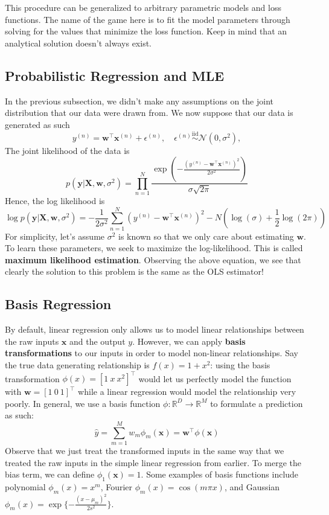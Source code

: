 \documentclass[11pt, letterpaper]{article}
\theoremstyle{definition}
\theoremstyle{plain}
\begin{document}
This procedure can be generalized to arbitrary parametric models and loss functions. The name of the game here is to fit the model parameters through solving for the values that minimize the loss function. Keep in mind that an analytical solution doesn't always exist.

\subsection{Probabilistic Regression and MLE}
In the previous subsection, we didn't make any assumptions on the joint distribution that our data were drawn from. We now suppose that our data is generated as such
\[y^{(n)} = \bm{w}^\top\bm{x}^{(n)} + \epsilon^{(n)}, \quad \epsilon^{(n)} \overset{\mathrm{iid}}{\sim} \mathcal{N}(0, \sigma^2),\]
The joint likelihood of the data is
\[p(\bm y | \bm X, \bm w, \sigma^2) = \prod_{n=1}^{N}\frac{\exp\left(-\frac{(y^{(n)} - \bm{w}^\top\bm{x}^{(n)})^2}{2\sigma^2}\right)}{\sigma\sqrt{2\pi}}\]
Hence, the log likelihood is
\[\log p(\bm y | \bm X, \bm w, \sigma^2) = -\frac{1}{2\sigma^2}\sum_{n=1}^{N} (y^{(n)}- \bm{w}^\top\bm{x}^{(n)})^2 - N\left(\log(\sigma) + \frac{1}{2}\log(2\pi)\right) \]
For simplicity, let's assume $\sigma^2$ is known so that we only care about estimating $\bm w$. To learn these parameters, we seek to maximize the log-likelihood. This is called \textbf{maximum likelihood estimation}. Observing the above equation, we see that clearly the solution to this problem is the same as the OLS estimator!

 \subsection{Basis Regression}
By default, linear regression only allows us to model linear relationships between the raw inputs $\bm x$ and the output $y$. However, we can apply \textbf{basis transformations} to our inputs in order to model non-linear relationships. Say the true data generating relationship is $f(x)=1+ x^2$: using the basis transformation $\phi(x) = [1 \ x \ x^2]^\top $ would let us perfectly model the function with $\bm w = [1 \ 0 \ 1]^\top$ while a linear regression would model the relationship very poorly.  In general, we use a basis function $\phi : \mathbb{R}^D \to \mathbb{R}^M$ to formulate a prediction as such:
\[ \hat y = \sum_{m = 1}^{M}w_m \phi_m(\bm{x}) =\bm{w}^\top{\phi}(\bm{x})\]
Observe that we just treat the transformed inputs in the same way that we treated the raw inputs in the simple linear regression from earlier. To merge the bias term, we can define $\phi_1(\bm{x})=1$. Some examples of basis functions include polynomial $\phi_m(x) = x^m$, Fourier $\phi_m(x) = \cos( m \pi x )$, and Gaussian $\phi_m(x) = \exp \{- \frac{(x - \mu_m)^2}{2s^2}\}$. 
\end{document}
